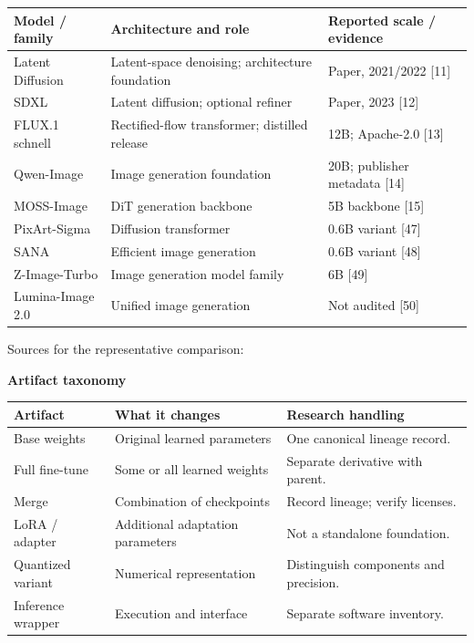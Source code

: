 \documentclass[10pt,a4paper]{article}
\newcommand{\sub}[1]{\vspace{1mm}\textbf{#1}\par}
\begin{document}
\begin{center}\small\begin{tabularx}{\linewidth}{@{}>{\RaggedRight\arraybackslash}p{.25\linewidth}>{\RaggedRight\arraybackslash}p{.42\linewidth}>{\RaggedRight\arraybackslash}p{.26\linewidth}@{}}\toprule
\textbf{Model / family} & \textbf{Architecture and role} & \textbf{Reported scale / evidence}\\\midrule
Latent Diffusion & Latent-space denoising; architecture foundation & Paper, 2021/2022 [11]\\
SDXL & Latent diffusion; optional refiner & Paper, 2023 [12]\\
FLUX.1 schnell & Rectified-flow transformer; distilled release & 12B; Apache-2.0 [13]\\
Qwen-Image & Image generation foundation & 20B; publisher metadata [14]\\
MOSS-Image & DiT generation backbone & 5B backbone [15]\\
PixArt-Sigma & Diffusion transformer & 0.6B variant [47]\\
SANA & Efficient image generation & 0.6B variant [48]\\
Z-Image-Turbo & Image generation model family & 6B [49]\\
Lumina-Image 2.0 & Unified image generation & Not audited [50]\\\bottomrule\end{tabularx}\end{center}

Sources for the representative comparison:  \cite{ldm,sdxl,flux,qwen,moss,pixart,sana,zimage,lumina}


\sub{Artifact taxonomy}

\begin{center}\small\begin{tabularx}{\linewidth}{@{}YYY@{}}\toprule
\textbf{Artifact} & \textbf{What it changes} & \textbf{Research handling}\\\midrule
Base weights & Original learned parameters & One canonical lineage record.\\
Full fine-tune & Some or all learned weights & Separate derivative with parent.\\
Merge & Combination of checkpoints & Record lineage; verify licenses.\\
LoRA / adapter & Additional adaptation parameters & Not a standalone foundation.\\
Quantized variant & Numerical representation & Distinguish components and precision.\\
Inference wrapper & Execution and interface & Separate software inventory.\\\bottomrule\end{tabularx}\end{center}
\end{document}
